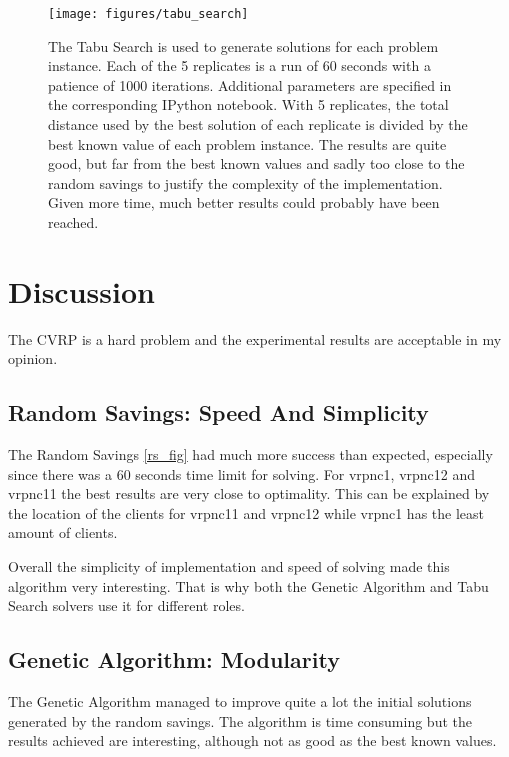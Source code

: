 \documentclass{article} %
\begin{document}
{\begin{figure}[!htb]
\begin{center}
 \texttt{[image: figures/tabu\_search]}
 \caption{\small  The Tabu Search is used to generate solutions for each problem instance. Each of the 5 replicates is a run of 60 seconds with a patience of 1000 iterations. Additional parameters are specified in the corresponding IPython notebook. With 5 replicates, the total distance used by the best solution of each replicate is divided by the best known value of each problem instance. The results are quite good, but far from the best known values and sadly too close to the random savings to justify the complexity of the implementation. Given more time, much better results could probably have been reached.}
 \label{ts_fig}
 \end{center}
\end{figure}


\newpage
\section{Discussion}
\label{analysis_results}

The CVRP is a hard problem and the experimental results are acceptable in my opinion.\newline

\subsection{Random Savings: Speed And Simplicity}
The Random Savings \ref{rs_fig} had much more success than expected, especially since there was a 60 seconds time limit for solving. For vrpnc1, vrpnc12 and vrpnc11 the best results are very close to optimality. This can be explained by the location of the clients for vrpnc11 and vrpnc12 while vrpnc1 has the least amount of clients.\newline

Overall the simplicity of implementation and speed of solving made this algorithm very interesting. That is why both the Genetic Algorithm and Tabu Search solvers use it for different roles.



\subsection{Genetic Algorithm: Modularity}

The Genetic Algorithm managed to improve quite a lot the initial solutions generated by the random savings.
The algorithm is time consuming but the results achieved are interesting, although not as good as the best known values.\newline

}
\end{document}
